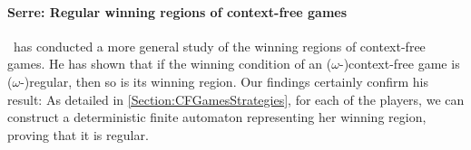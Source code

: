 \documentclass[../../diss.tex]{subfiles}
\begin{document}
\paragraph{Serre: Regular winning regions of context-free games}

~has conducted a more general study of the winning regions of context-free games.
He has shown that if the winning condition of an ($\omega$-)context-free game is ($\omega$-)regular, then so is its winning region.
Our findings certainly confirm his result:
As detailed in \cref{Section:CFGamesStrategies}, for each of the players, we can construct a deterministic finite automaton representing her winning region, proving that it is regular.
\end{document}
